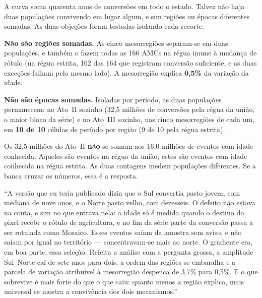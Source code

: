 A curva soma quarenta anos de conversões em todo o estado. Talvez não haja duas
populações convivendo em lugar algum, e sim regiões ou épocas diferentes
somadas. As duas objeções foram testadas isolando cada recorte.

\textbf{Não são regiões somadas.} As cinco mesorregiões separam-se em duas
populações, e também o fazem todas as 166 AMCs na régua imune à mudança de
rótulo (na régua estrita, 162 das 164 que registram conversão suficiente, e as
duas exceções falham pelo mesmo lado). A mesorregião explica \textbf{0,5\%} da
variação da idade.

\textbf{Não são épocas somadas.} Isoladas por período, as duas populações
permanecem: no Ato~II sozinho (32,5 milhões de conversões pela régua da união, o
maior bloco da série) e no Ato~III sozinho, nas cinco mesorregiões de cada um,
em \textbf{10 de 10} células de período por região (9 de 10 pela régua estrita).

\begin{armadilha}
Os 32,5 milhões do Ato~II \textbf{não} se somam aos 16,0 milhões de eventos com
idade conhecida. Aqueles são eventos na régua da união; estes são eventos com
idade conhecida na régua estrita. As duas contagens medem populações
diferentes. Se a banca cruzar os números, essa é a resposta.
\end{armadilha}

\begin{nabanca}
``A versão que eu teria publicado dizia que o Sul convertia pasto jovem, com
mediana de nove anos, e o Norte pasto velho, com dezesseis. O defeito não estava
na conta, e sim no que entrava nela: a idade só é medida quando o destino do
pixel recebe o rótulo de agricultura, e no fim da série parte da conversão passa
a ser rotulada como Mosaico. Esses eventos saíam da amostra sem aviso, e não
saíam por igual no território --- concentravam-se mais ao norte. O gradiente
era, em boa parte, essa seleção. Refeita a análise com a pergunta grossa, a
amplitude Sul--Norte cai de sete anos para dois, a ordem das regiões se
embaralha e a parcela de variação atribuível à mesorregião despenca de 3,7\%
para 0,5\%. E o que sobrevive é mais forte do que o que caiu: quanto menos a
região explica, mais universal se mostra a convivência dos dois mecanismos.''
\end{nabanca}
